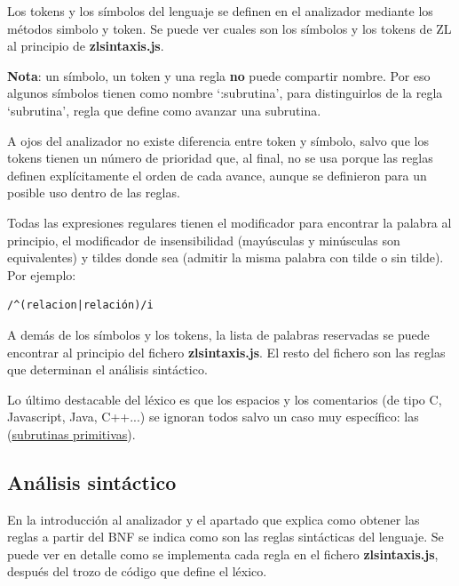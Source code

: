 \documentclass{report}
\begin{document}
	Los tokens y los símbolos del lenguaje se definen en el analizador mediante los métodos simbolo y token. Se puede ver cuales son los símbolos y los tokens de ZL al principio de \textbf{zlsintaxis.js}. 
	
	\vspace{10px}
	\noindent
	\textbf{Nota}: un símbolo, un token y una regla \textbf{no} puede compartir nombre. Por eso algunos símbolos tienen como nombre `:subrutina', para distinguirlos de la regla `subrutina', regla que define como avanzar una subrutina.
	
	\vspace{10px}
	
	A ojos del analizador no existe diferencia entre token y símbolo, salvo que los tokens tienen un número de prioridad que, al final, no se usa porque las reglas definen explícitamente el orden de cada avance, aunque se definieron para un posible uso dentro de las reglas. 

	\vspace{10px}
	
	Todas las expresiones regulares tienen el modificador para encontrar la palabra al principio, el modificador de insensibilidad (mayúsculas y minúsculas son equivalentes) y tildes donde sea (admitir la misma palabra con tilde o sin tilde). Por ejemplo: 
	
	\begin{BVerbatim}
/^(relacion|relación)/i
	\end{BVerbatim}

	\vspace{10px}
	
	A demás de los símbolos y los tokens, la lista de palabras reservadas se puede encontrar al principio del fichero \textbf{zlsintaxis.js}. El resto del fichero son las reglas que determinan el análisis sintáctico.
	
	\vspace{10px}
	
	Lo último destacable del léxico es que los espacios y los comentarios (de tipo C, Javascript, Java, C++...) se ignoran todos salvo un caso muy específico: las (\hyperref[subrutinasprimitivas]{subrutinas primitivas}).
	
	\subsection{Análisis sintáctico}
	
	En la introducción al analizador y el apartado que explica como obtener las reglas a partir del BNF se indica como son las reglas sintácticas del lenguaje. Se puede ver en detalle como se implementa cada regla en el fichero \textbf{zlsintaxis.js}, después del trozo de código que define el léxico. 
	
\end{document}
